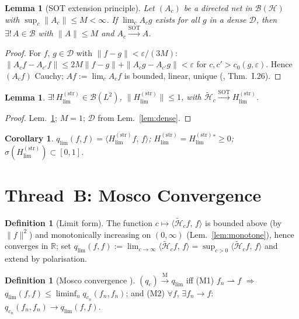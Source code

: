 \documentclass[12pt,a4paper]{amsart}
\newtheorem{lemma}[theorem]{Lemma}
\newtheorem{corollary}[theorem]{Corollary}
\theoremstyle{definition}
\newtheorem{definition}[theorem]{Definition}
\theoremstyle{remark}
\newcommand{\ip}[2]{\langle #1,\, #2\rangle}
\newcommand{\Hc}{\widetilde{\mathcal{H}}_c}
\newcommand{\Hstrong}{H_{\lim}^{(\mathrm{str})}}
\newcommand{\qc}{q_c}
\newcommand{\qlim}{q_{\lim}}
\begin{document}
\begin{lemma}[SOT extension principle]
\label{lem:sc}
Let $(A_c)$ be a directed net in
$\mathcal{B}(\mathcal{H})$ with
$\sup_c\|A_c\|\le M<\infty$.
If $\lim_c A_cg$ exists for all $g$
in a dense $\mathcal{D}$,
then $\exists!\,A\in\mathcal{B}$
with $\|A\|\le M$ and
$A_c\xrightarrow{\mathrm{SOT}}A$.
\end{lemma}
\begin{proof}
For $f$, $g\in\mathcal{D}$ with
$\|f-g\|<\varepsilon/(3M)$:
$\|A_cf-A_{c'}f\|
\le 2M\|f-g\|+\|A_cg-A_{c'}g\|
<\varepsilon$
for $c,c'>c_0(g,\varepsilon)$.
Hence $(A_cf)$ Cauchy;
$Af:=\lim_cA_cf$ is bounded,
linear, unique
(\cite{ReedSimon1975}, Thm.~I.26).
\end{proof}

\begin{lemma}
\label{lem:hlim-bounded}
$\exists!\,\Hstrong\in\mathcal{B}(L^2)$,
$\|\Hstrong\|\le 1$,
with $\Hc\xrightarrow{\mathrm{SOT}}\Hstrong$.
\end{lemma}
\begin{proof}
Lem.~\ref{lem:sc}; $M=1$;
$\mathcal{D}$ from Lem.~\ref{lem:dense}.
\end{proof}

\begin{corollary}\label{cor:qlim-op}
$\qlim(f,f)=\ip{\Hstrong f}{f}$;
$\Hstrong=\Hstrong^*\ge 0$;
$\sigma(\Hstrong)\subset[0,1]$.
\end{corollary}

\section{Thread~B: Mosco Convergence}
\label{sec:mosco}

\begin{definition}[Limit form]
\label{def:qlim}
The function $c\mapsto\ip{\Hc f}{f}$
is bounded above (by $\|f\|^2$) and
monotonically increasing
on $(0,\infty)$
(Lem.~\ref{lem:monotone}),
hence converges in $\mathbb{R}$;
set $\qlim(f,f):=\lim_{c\to\infty}
\ip{\Hc f}{f}=\sup_{c>0}\ip{\Hc f}{f}$
and extend by polarisation.
\end{definition}

\begin{definition}[Mosco convergence
  \cite{Mosco1969}]
\label{def:mosco}
$(\qc)\xrightarrow{\mathrm{M}}\qlim$
iff (M1) $f_n\rightharpoonup f$
$\Rightarrow$
$\qlim(f,f)\le\liminf_n q_{c_n}(f_n,f_n)$;
and (M2) $\forall f$,
$\exists f_n\to f$:
$q_{c_n}(f_n,f_n)\to\qlim(f,f)$.
\end{definition}
\end{document}
